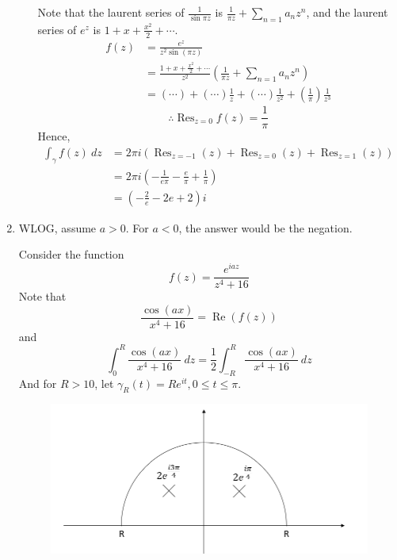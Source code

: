 \documentclass{article}
\newcommand{\paren}[1]{\left(#1\right)}
\DeclareMathOperator{\real}{Re}
\DeclareMathOperator{\Res}{Res}
\begin{document}
\begin{enumerate}
\begin{enumerate}
Note that the laurent series of $\frac{1}{\sin \pi z}$ is $\frac{1}{\pi z} + \sum_{n=1} a_n z^n$, and the laurent series of $e^z$ is $1 + x + \frac{x^2}{2} + \cdots$.
\begin{align*}
f(z) &= \frac{e^z}{z^2 \sin(\pi z)} \\
    &= \frac{1 + x + \frac{x^2}{2} + \cdots}{z^2} \paren{\frac{1}{\pi z} + \sum_{n=1} a_n z^n} \\
    &= (\cdots) + (\cdots)\frac{1}{z} + (\cdots)\frac{1}{z^2} + (\frac{1}{\pi})\frac{1}{z^3}
\end{align*}
\[\therefore \Res_{z=0} f(z) = \frac{1}{\pi}\]
Hence,
\begin{align*}
\int_\gamma f(z)\ dz &= 2\pi i (\Res_{z=-1}(z) + \Res_{z=0}(z) + \Res_{z=1}(z)) \\
    &= 2\pi i\paren{-\frac{1}{e\pi} - \frac{e}{\pi} + \frac{1}{\pi}} \\
    &= \paren{-\frac{2}{e} - 2e + 2}i
\end{align*}
\end{enumerate}
\item WLOG, assume $a>0$. For $a<0$, the answer would be the negation.

Consider the function
\[
f(z) = \frac{e^{iaz}}{z^4 + 16}
\]
Note that
\[\frac{\cos (ax)}{x^4 + 16} = \real(f(z))\]
and
\[\int_0^R \frac{\cos (ax)}{x^4 + 16}\ dz = \frac{1}{2}\int_{-R}^R \frac{\cos (ax)}{x^4 + 16}\ dz\]
And for $R > 10$, let $\gamma_R(t) = R e^{it}, 0\leq t \leq \pi$.
\begin{figure}[h]
\centering
\includegraphics[scale=0.6]{Q4_diagram}
\end{figure}


\end{enumerate}
\end{document}
